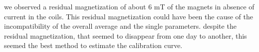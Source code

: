 \documentclass[a4paper,12pt,abstracton]{scrartcl}
\begin{document}
\begin{table}[H]
\caption{}
\centering
{}
\label{table:Zan}
\end{table}


\begin{table}[H]
\caption{}
\centering
{}
\label{table:ZanT}
\end{table}

we observed a residual magnetization of about 6 mT of the magnets in absence of current in the coils. This residual magnetization could have been the cause of the incompatibility of the overall average and the single parameters. despite the residual magnetization, that seemed to disappear from one day to another, this seemed the best method to estimate the calibration curve.
\end{document}
